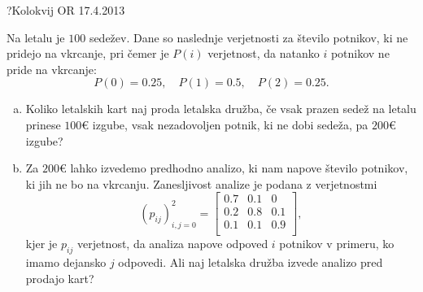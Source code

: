 \begin{naloga}{?}{Kolokvij OR 17.4.2013}
\begin{vprasanje}
Na letalu je $100$ sedežev.
Dane so naslednje verjetnosti za število potnikov,
ki ne pridejo na vkrcanje,
pri čemer je $P(i)$ verjetnost, da natanko $i$ potnikov ne pride na vkrcanje:
$$
P(0) = 0.25, \quad P(1) = 0.5, \quad P(2) = 0.25 .
$$
\begin{enumerate}[(a)]
\item Koliko letalskih kart naj proda letalska družba,
če vsak prazen sedež na letalu prinese $100 €$ izgube,
vsak nezadovoljen potnik, ki ne dobi sedeža, pa $200 €$ izgube?

\item Za $200 €$ lahko izvedemo predhodno analizo,
ki nam napove število potnikov, ki jih ne bo na vkrcanju.
Zanesljivost analize je podana z verjetnostmi
$$
(p_{ij})_{i,j=0}^2 = \begin{bmatrix}
0.7 & 0.1 & 0 \\
0.2 & 0.8 & 0.1 \\
0.1 & 0.1 & 0.9 \\
\end{bmatrix} ,
$$
kjer je $p_{ij}$ verjetnost,
da analiza napove odpoved $i$ potnikov v primeru,
ko imamo dejansko $j$ odpovedi.
Ali naj letalska družba izvede analizo pred prodajo kart?
\end{enumerate}
\end{vprasanje}
\begin{odgovor}
\end{odgovor}
\end{naloga}


